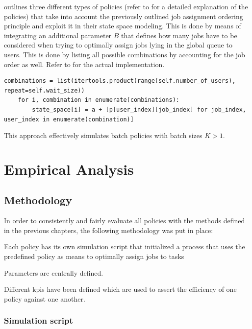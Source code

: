 \documentclass{seal_thesis}
\begin{document}
 outlines three different types of policies (refer to  for a detailed explanation of the policies) that take into account the previously outlined job assignment ordering principle and exploit it in their state space modeling. This is done by means of integrating an additional parameter $B$ that defines how many jobs have to be considered when trying to optimally assign jobs lying in the global queue to users. This is done by listing all possible combinations by accounting for the job order as well. Refer to  for the actual implementation.

\begin{lstlisting}[caption=State space modeling by considering $B$ jobs from the global queue and integrating all possible combinations,label=lst:wz_combinations,style=CustomPython]
	combinations = list(itertools.product(range(self.number_of_users), repeat=self.wait_size))
    for i, combination in enumerate(combinations):
        state_space[i] = a + [p[user_index][job_index] for job_index, user_index in enumerate(combination)]
\end{lstlisting}

This approach effectively simulates batch policies with batch sizes $K>1$.


\chapter{Empirical Analysis}
\label{ch:empirical_analysis}

\section{Methodology}

In order to consistently and fairly evaluate all policies with the methods defined in the previous chapters, the following methodology was put in place:
\begin{enumerate*}
	\item Each policy has its own simulation script that initialized a process that uses the predefined policy as means to optimally assign jobs to tasks
	\item Parameters are centrally defined.
	\item Different \glspl{kpi} have been defined which are used to assert the efficiency of one policy against one another.
\end{enumerate*}

\subsection{Simulation script}
\end{document}
